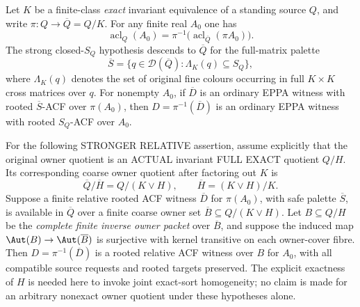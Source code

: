 \begin{lemma}
\label{lem:acf-finite-lift}
Let \(K\) be a finite-class \emph{exact} invariant
equivalence of a standing source \(Q\), and write
\(\pi:Q\to\overline Q=Q/K\).
For any finite real \(A_0\) one has
\begin{equation}\label{eq:acf-finite-acl}
 \operatorname{acl}_Q(A_0)=
 \pi^{-1}\bigl(\operatorname{acl}_{\overline Q}(\pi A_0)\bigr).
\end{equation}
The strong closed-\(S_Q\) hypothesis descends to
\(\overline Q\) for the full-matrix palette
\[
 \overline S=\{q\in\mathcal D(\overline Q):
                    \Lambda_K(q)\subseteq S_Q\},
\]
where \(\Lambda_K(q)\) denotes the set of original fine
colours occurring in full \(K\times K\) cross matrices over \(q\).
For nonempty \(A_0\), if \(\overline D\) is an ordinary EPPA
witness with rooted \(\overline S\)-ACF over \(\pi(A_0)\),
then \(D=\pi^{-1}(\overline D)\) is an ordinary EPPA witness
with rooted \(S_Q\)-ACF over \(A_0\).

For the following STRONGER RELATIVE
assertion, assume explicitly that the
original owner quotient is an ACTUAL
invariant FULL EXACT quotient \(Q/H\).
Its corresponding coarse owner quotient
after factoring out \(K\) is
\[
 \overline Q/\overline H=Q/(K\vee H),
 \qquad \overline H=(K\vee H)/K .
\]
Suppose a finite relative rooted ACF
witness \(\overline D\) for \(\pi(A_0)\), with safe palette
\(\overline S\), is available in \(\overline Q\) over a finite
coarse owner set
\(\overline B\subseteq Q/(K\vee H)\).
Let \(B\subseteq Q/H\) be the
\emph{complete finite inverse owner
packet} over \(\overline B\), and suppose
the induced map
\(\Aut(B)\to\Aut(\overline B)\) is
surjective with kernel transitive on
each owner-cover fibre. Then
\(D=\pi^{-1}(\overline D)\) is a rooted
relative ACF witness over \(B\) for
\(A_0\), with all compatible source
requests and rooted targets preserved.
The explicit exactness of \(H\)
is needed here to invoke joint
exact-sort homogeneity; no claim is
made for an arbitrary nonexact owner
quotient under these hypotheses alone.
\end{lemma}

